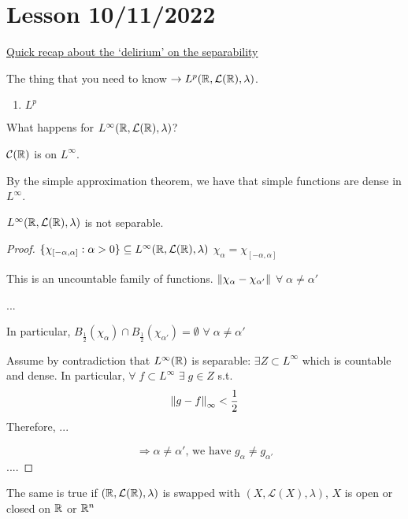 \section{Lesson 10/11/2022}
\underline{Quick recap about the `delirium' on the separability}

The thing that you need to know \(\to L^p(\mathbb{R}, \mathcal{L}(\mathbb{R}), \lambda)\).
\begin{enumerate}
    \item \(L^p\)
\end{enumerate}
What happens for \(L^{\infty}(\mathbb{R}, \mathcal{L}(\mathbb{R}), \lambda)\)? 

\(\mathcal{C}(\mathbb{R})\) is on \(L^\infty\).

By the simple approximation theorem, we have that simple functions are dense in \(L^\infty\).
\begin{theorem}
    \(L^{\infty}(\mathbb{R}, \mathcal{L}(\mathbb{R}), \lambda)\) is not separable.
\end{theorem}
\begin{proof}
    \(\{\chi_{[-\alpha, \alpha]}: \alpha >0\} \subseteq L^{\infty}(\mathbb{R}, \mathcal{L}(\mathbb{R}), \lambda)\)
    \(\chi_\alpha = \chi_{[-\alpha, \alpha]}\)

    This is an uncountable family of functions. \(\norm{\chi_\alpha - \chi_{\alpha'}}\) \(\forall \; \alpha \neq \alpha'\)

    ...

    In particular, \(B_{\frac{1}{2}}(\chi_\alpha) \cap B_{\frac{1}{2}}(\chi_{\alpha '}) = \emptyset \) \(\forall \; \alpha \neq \alpha'\)

    Assume by contradiction that \(L^\infty(\mathbb{R})\) is separable: \(\exists Z \subset L^\infty\) which is countable and dense. In particular, \(\forall \; f \subset L^\infty\) \(\exists \; g \in Z\) s.t. 
    \[
        \norm{g-f }_\infty < \frac{1}{2}
    \]
    Therefore, ...

    \[
        \Rightarrow \alpha \neq \alpha' \text{, we have } g_\alpha \neq g_{\alpha'}
    \]
    ....
\end{proof}

\begin{remark}
    The same is true if \((\mathbb{R}, \mathcal{L}(\mathbb{R}), \lambda)\) is swapped with \((X, \mathcal{L}(X), \lambda)\), \(X\) is open or closed on \(\mathbb{R}\) or \(\mathbb{R}^n\)
\end{remark}

